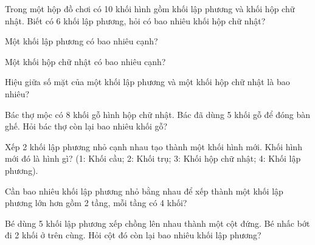 \begin{ex}
Trong một hộp đồ chơi có 10 khối hình gồm khối lập phương và khối hộp chữ nhật. Biết có 6 khối lập phương, hỏi có bao nhiêu khối hộp chữ nhật?
\end{ex}

\begin{ex}
Một khối lập phương có bao nhiêu cạnh?
\end{ex}

\begin{ex}
Một khối hộp chữ nhật có bao nhiêu cạnh?
\end{ex}

\begin{ex}
Hiệu giữa số mặt của một khối lập phương và một khối hộp chữ nhật là bao nhiêu?
\end{ex}

\begin{ex}
Bác thợ mộc có 8 khối gỗ hình hộp chữ nhật. Bác đã dùng 5 khối gỗ để đóng bàn ghế. Hỏi bác thợ còn lại bao nhiêu khối gỗ?
\end{ex}

\begin{ex}
Xếp 2 khối lập phương nhỏ cạnh nhau tạo thành một khối hình mới. Khối hình mới đó là hình gì? (1: Khối cầu; 2: Khối trụ; 3: Khối hộp chữ nhật; 4: Khối lập phương).
\end{ex}

\begin{ex}
Cần bao nhiêu khối lập phương nhỏ bằng nhau để xếp thành một khối lập phương lớn hơn gồm 2 tầng, mỗi tầng có 4 khối?
\end{ex}

\begin{ex}
Bé dùng 5 khối lập phương xếp chồng lên nhau thành một cột đứng. Bé nhấc bớt đi 2 khối ở trên cùng. Hỏi cột đó còn lại bao nhiêu khối lập phương?
\end{ex}

